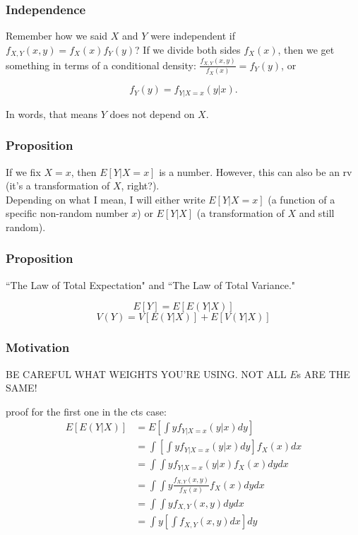 \documentclass{beamer}
\begin{document}
\begin{frame}
\frametitle{Independence}

Remember how we said $X$ and $Y$ were independent if $f_{X,Y}(x,y) = f_X(x)f_Y(y)$? If we divide both sides $f_X(x)$, then we get something in terms of a conditional density: $\frac{f_{X,Y}(x,y)}{f_X(x)} = f_Y(y)$, or

\[
f_Y(y) = f_{Y|X=x}(y|x).
\]

In words, that means $Y$ does not depend on $X$. 
\end{frame}
\begin{frame}
\frametitle{Proposition}

If we fix $X=x$, then $E[Y|X=x]$ is a number. However, this can also be an rv (it's a transformation of $X$, right?). \\

Depending on what I mean, I will either write $E[Y|X=x]$ (a function of a specific non-random number $x$) or $E[Y|X]$ (a transformation of $X$ and still random).
\newline



\end{frame}



\begin{frame}
\frametitle{Proposition}

``The Law of Total Expectation" and ``The Law of Total Variance."

\[
E[Y] = E[E(Y|X)]
\]
\[
V(Y) = V[E(Y|X)] + E[V(Y|X)]
\]

\end{frame}



\begin{frame}
\frametitle{Motivation}
BE CAREFUL WHAT WEIGHTS YOU'RE USING. NOT ALL $E$s ARE THE SAME!

proof for the first one in the cts case:
\begin{align*}
E[E(Y|X)] &= E \left[ \int y f_{Y|X=x}(y|x) dy \right] \\
&= \int \left[ \int y f_{Y|X=x}(y|x) dy \right] f_X(x) dx \\
&= \int \int y f_{Y|X=x}(y|x) f_X(x) dy dx \\
&= \int \int y \frac{f_{X,Y}(x,y)}{f_X(x)} f_X(x) dy dx \\
&= \int \int y f_{X,Y}(x,y) dy dx \\
&= \int y \left[ \int f_{X,Y}(x,y) dx \right] dy
\end{align*}

\end{frame}
\end{document}
